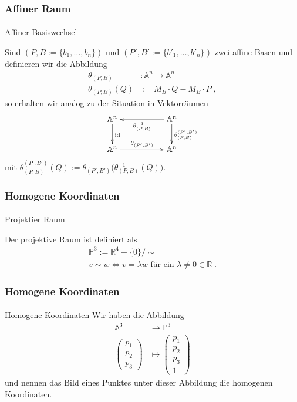 \documentclass{beamer}
\begin{document}
\begin{frame}
    \frametitle{Affiner Raum}
\framesubtitle{}
\begin{block}{Affiner Basiswechsel}

Sind $(P,B:= \{b_1, \hdots , b_n \})$  und $(P',B':= \{b'_1, \hdots , b'_n \})$ zwei affine Basen  und definieren wir 
die Abbildung
\begin{align*}
\theta_{(P,B)} & :  \mathbb{A}^n \to \mathbb{A}^n \\
\theta_{(P,B)}(Q) & := M_B \cdot Q - M_B \cdot P \; ,
\end{align*}
so erhalten wir analog zu der Situation in Vektorräumen
\begin{align*}
\xymatrix{
\mathbb{A}^n  \ar[d]^{\text{id}} &  & \ar[ll]^{\theta_{(P,B)}^{-1}} \mathbb{A}^n \ar[d]^{\theta_{(P,B)}^{(P',B')}} \\
\mathbb{A}^n  \ar[rr]^{\theta_{(P',B')}} & &  \mathbb{A}^n
}
\end{align*}
mit $\theta_{(P,B)}^{(P',B')} (Q) :=   \theta_{(P',B')} \biggl ( \theta_{(P,B)}^{-1} (Q) \biggr)$.
\end{block}

\end{frame}



\begin{frame}
    \frametitle{Homogene Koordinaten}
\framesubtitle{}
\begin{block}{Projektier Raum}

Der projektive  Raum ist definiert als
\begin{align*}
\mathbb{P}^3 := \mathbb{R}^{4} - \{ 0\} / \sim \\
v \sim w \Leftrightarrow v = \lambda w \text{ für ein } \lambda \neq 0 \in \mathbb{R} \; . 
\end{align*}
\end{block}
\end{frame}

\begin{frame}
    \frametitle{Homogene Koordinaten}
\framesubtitle{}
\begin{block}{Homogene Koordinaten}
Wir haben die Abbildung
\begin{align*}
\mathbb{A}^3 & \to \mathbb{P}^3 \\
\begin{pmatrix} p_1 \\ p_2 \\ p_3 \end{pmatrix} & \mapsto \begin{pmatrix} p_1 \\ p_2 \\ p_3  \\  1\end{pmatrix} 
\end{align*}
und nennen das Bild eines Punktes unter dieser Abbildung die homogenen Koordinaten.
\end{block}
\end{frame}
\end{document}
